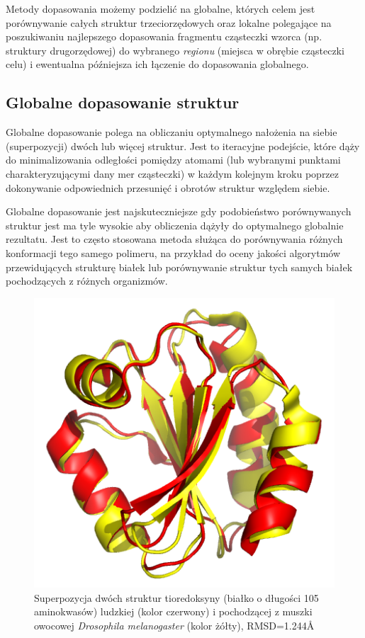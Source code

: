 \documentclass[licencjacka]{pracamgr}
\begin{document}
Metody dopasowania możemy podzielić na globalne, których celem jest porównywanie całych struktur trzeciorzędowych oraz lokalne polegające na poszukiwaniu najlepszego dopasowania fragmentu cząsteczki wzorca (np. struktury drugorzędowej) do wybranego \textit{regionu} (miejsca w obrębie cząsteczki celu) i ewentualna późniejsza ich łączenie do dopasowania globalnego.

\subsection{Globalne dopasowanie struktur} 

Globalne dopasowanie polega na obliczaniu optymalnego nałożenia na siebie (superpozycji) dwóch lub więcej struktur. Jest to iteracyjne podejście, które dąży do minimalizowania odległości pomiędzy atomami (lub wybranymi punktami charakteryzującymi dany mer cząsteczki) w każdym kolejnym kroku poprzez dokonywanie odpowiednich przesunięć i obrotów struktur względem siebie. 

Globalne dopasowanie jest najskuteczniejsze gdy podobieństwo porównywanych struktur jest ma tyle wysokie aby obliczenia dążyły do optymalnego globalnie rezultatu. Jest to często stosowana metoda służąca do porównywania różnych konformacji tego samego polimeru, na przykład do oceny jakości algorytmów przewidujących strukturę białek lub porównywanie struktur tych samych białek pochodzących z różnych organizmów. 

\begin{figure}[H]
\centering
\includegraphics[scale=0.7]{global_superposition}
\caption{Superpozycja dwóch struktur tioredoksyny (białko o długości 105 aminokwasów) ludzkiej (kolor czerwony) i pochodzącej z muszki owocowej \textit{Drosophila melanogaster} (kolor żółty), RMSD=1.244\AA }
\end{figure}
\end{document}
